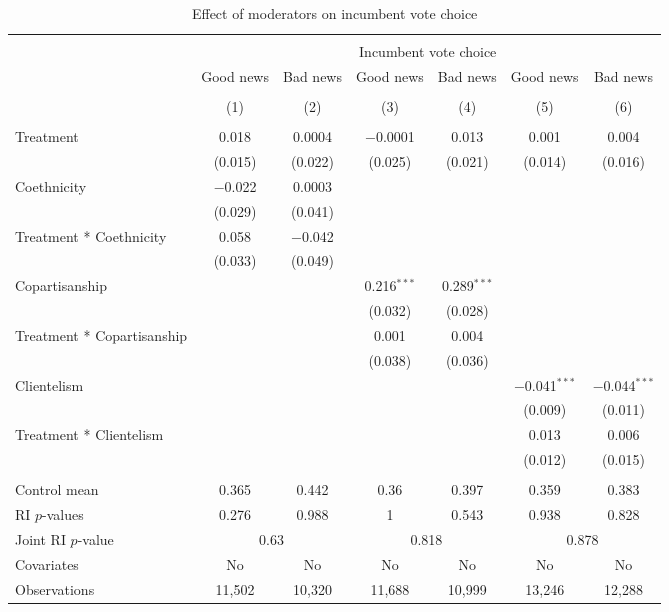 
\begin{table}[!htbp] \centering 
  \caption{Effect of moderators on incumbent vote choice} 
  \label{moderators} 
\begin{tabular}{@{\extracolsep{1pt}}lcccccc} 
\\[-1.8ex]\hline 
\hline \\[-1.8ex] 
 & \multicolumn{6}{c}{Incumbent vote choice} \\ 
\cline{2-7} 
 & Good news & Bad news & Good news & Bad news & Good news & Bad news \\ 
\cline{2-7}
\\[-1.8ex] & (1) & (2) & (3) & (4) & (5) & (6)\\ 
\hline \\[-1.8ex] 
 Treatment & 0.018 & 0.0004 & $-$0.0001 & 0.013 & 0.001 & 0.004 \\ 
  & (0.015) & (0.022) & (0.025) & (0.021) & (0.014) & (0.016) \\ 
  Coethnicity & $-$0.022 & 0.0003 &  &  &  &  \\ 
  & (0.029) & (0.041) &  &  &  &  \\ 
  Treatment * Coethnicity & 0.058 & $-$0.042 &  &  &  &  \\ 
  & (0.033) & (0.049) &  &  &  &  \\ 
  Copartisanship &  &  & 0.216$^{***}$ & 0.289$^{***}$ &  &  \\ 
  &  &  & (0.032) & (0.028) &  &  \\ 
  Treatment * Copartisanship &  &  & 0.001 & 0.004 &  &  \\ 
  &  &  & (0.038) & (0.036) &  &  \\ 
  Clientelism &  &  &  &  & $-$0.041$^{***}$ & $-$0.044$^{***}$ \\ 
  &  &  &  &  & (0.009) & (0.011) \\ 
  Treatment * Clientelism &  &  &  &  & 0.013 & 0.006 \\ 
  &  &  &  &  & (0.012) & (0.015) \\ 
 \hline \\[-1.8ex] 
Control mean & 0.365 & 0.442 & 0.36 & 0.397 & 0.359 & 0.383 \\ 
RI $p$-values & 0.276 & 0.988 & 1 & 0.543 & 0.938 & 0.828 \\ 
Joint RI $p$-value & \multicolumn{2}{c}{0.63} & \multicolumn{2}{c}{0.818} & \multicolumn{2}{c}{0.878} \\
Covariates & No & No & No & No & No & No \\ 
Observations & 11,502 & 10,320 & 11,688 & 10,999 & 13,246 & 12,288 \\ 

\end{tabular}
\end{table}
